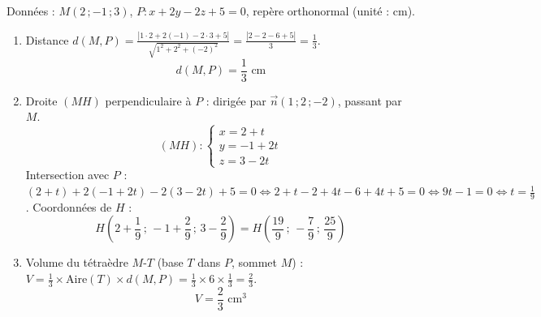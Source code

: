 \documentclass[11pt]{article}
\begin{document}
\begin{corrige}
Données : $M(2\,;-1\,;3)$, $P : x + 2y - 2z + 5 = 0$, repère orthonormal (unité : cm).
\begin{enumerate}
\item Distance $d(M,P) = \frac{|1\cdot2 + 2(-1) - 2\cdot3 + 5|}{\sqrt{1^2+2^2+(-2)^2}} = \frac{|2 - 2 - 6 + 5|}{3} = \frac{1}{3}$.
\[
\boxed{d(M,P) = \frac{1}{3}\text{ cm}}
\]

\item Droite $(MH)$ perpendiculaire à $P$ : dirigée par $\vec{n}(1\,;2\,;-2)$, passant par $M$.
\[
(MH) : \begin{cases} x = 2 + t \\ y = -1 + 2t \\ z = 3 - 2t \end{cases}
\]
Intersection avec $P$ :
$(2+t) + 2(-1+2t) - 2(3-2t) + 5 = 0 \iff 2+t -2+4t -6+4t +5 = 0 \iff 9t -1 = 0 \iff t = \frac{1}{9}$.
Coordonnées de $H$ :
\[
H\left(2+\frac{1}{9}\,;\,-1+\frac{2}{9}\,;\,3-\frac{2}{9}\right) = \boxed{H\left(\frac{19}{9}\,;\,-\frac{7}{9}\,;\,\frac{25}{9}\right)}
\]

\item Volume du tétraèdre $M$-$T$ (base $T$ dans $P$, sommet $M$) :
$V = \frac{1}{3} \times \text{Aire}(T) \times d(M,P) = \frac{1}{3} \times 6 \times \frac{1}{3} = \frac{2}{3}$.
\[
\boxed{V = \frac{2}{3}\text{ cm}^3}
\]
\end{enumerate}
\end{corrige}
\end{document}
